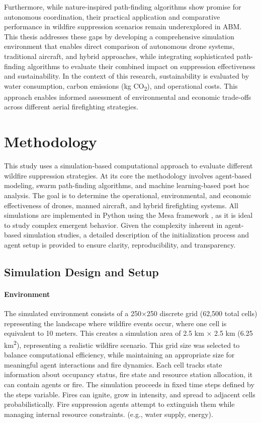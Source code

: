 \documentclass[11pt, a4paper]{article}
\begin{document}
Furthermore, while nature-inspired path-finding algorithms show promise for autonomous coordination, their practical application and comparative performance in wildfire suppression scenarios remain underexplored in ABM. This thesis addresses these gaps by developing a comprehensive simulation environment that enables direct comparison of autonomous drone systems, traditional aircraft, and hybrid approaches, while integrating sophisticated path-finding algorithms to evaluate their combined impact on suppression effectiveness and sustainability.
In the context of this research, sustainability is evaluated by water consumption, carbon emissions (kg CO\textsubscript{2}), and operational costs. This approach enables informed assessment of environmental and economic trade-offs across different aerial firefighting strategies.

\section{Methodology}
\label{sec:Methodology}

This study uses a simulation-based computational approach to evaluate different wildfire suppression strategies. At its core the methodology involves agent-based modeling, swarm path-finding algorithms, and machine learning-based post hoc analysis. The goal is to determine the operational, environmental, and economic effectiveness of drones, manned aircraft, and hybrid firefighting systems. All simulations are implemented in Python using the Mesa framework \citep{terMesa}, as it is ideal to study complex emergent behavior. Given the complexity inherent in agent-based simulation studies, a detailed description of the initialization process and agent setup is provided to ensure clarity, reproducibility, and transparency.

\subsection{Simulation Design and Setup}
\paragraph{Environment} The simulated environment consists of a 250×250 discrete grid (62,500 total cells) representing the landscape where wildfire events occur, where one cell is equivalent to 10 meters. This creates a simulation area of 2.5 km × 2.5 km (6.25 km\textsuperscript{2}), representing a realistic wildfire scenario. This grid size was selected to balance computational efficiency, while maintaining an appropriate size for meaningful agent interactions and fire dynamics. Each cell tracks state information about occupancy status, fire state and resource station allocation, it can contain agents or fire. The simulation proceeds in fixed time steps defined by the steps variable. Fires can ignite, grow in intensity, and spread to adjacent cells probabilistically. Fire suppression agents attempt to extinguish them while managing internal resource constraints. (e.g., water supply, energy). 
\end{document}
